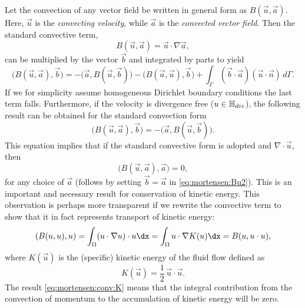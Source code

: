 Let the convection of any vector field be written in general form as
$B(\vec{u},\vec{a})$. Here, $\vec{u}$ is the \emph{convecting
  velocity}, while $\vec{a}$ is the \emph{convected vector
  field}. Then the standard convective term,
\begin{equation}
B(\vec{u},\vec{a}) = \vec{u}\cdot \nabla \vec{a},
\end{equation}
can be multiplied by the vector $\vec{b}$ and integrated by parts to yield
\begin{equation}
 \bigl( B(\vec{u}, \vec{a}), \vec{b}\bigr) = -\bigl( \vec{a}, B(\vec{u},\vec{b})\bigr) - \bigl( B (\vec{a}, \vec{u}), \vec{b} \bigr) + \int_{\Gamma} \left(\vec{b} \cdot \vec{a} \right)\left(\vec{u} \cdot \vec{n} \right) \, d\Gamma.
\label{eq:mortensen:Bu1}
\end{equation}
If we for simplicity assume homogeneous Dirichlet boundary conditions
the last term falls. Furthermore, if the velocity is divergence free
(${ u }\in \mathbb{H}_{div}$), the following result can be obtained for
the standard convection form
\begin{equation}
\bigl( B(\vec{u},\vec{a}), \vec{b} \bigr) = -\bigl( \vec{a}, B(\vec{u},\vec{b}) \bigr).
\label{eq:mortensen:Bu2}
\end{equation}
This equation implies that if the standard convective form is adopted
and $\nabla\cdot\vec{u}$, then
\begin{equation}
\bigl( B(\vec{u}, \vec{a}), \vec{a} \bigr) = 0,
\label{eq:mortensen:B0}
\end{equation}
for any choice of $\vec{a}$ (follows by setting $\vec{b}=\vec{a}$ in
\eqref{eq:mortensen:Bu2}). This is an important and necessary result
for conservation of kinetic energy. This observation is perhaps more
transparent if we rewrite the convective term to show that it in fact
represents transport of kinetic energy:
\begin{equation}
\label{eq:mortensen:conv:K}
\left(B(\vec{u}, \vec{u}), \vec{u} \right)
= \int_\Omega (\vec{u}\cdot\nabla\vec{u})\cdot\vec{u}\dx
= \int_\Omega \vec{u}\cdot\nabla K(\vec{u})\dx  
= B(\vec{u}, \vec{u}\cdot\vec{u}),
\end{equation}
where $K(\vec{u})$ is the (specific) kinetic energy of the fluid flow defined
as
\begin{equation}
 K(\vec{u})=\frac{1}{2}\, \vec{u}\cdot \vec{u}. \label{eq:mortensen:K}
\end{equation}
The result \eqref{eq:mortensen:conv:K} means that the integral
contribution from the convection of momentum to the accumulation of
kinetic energy will be zero.

